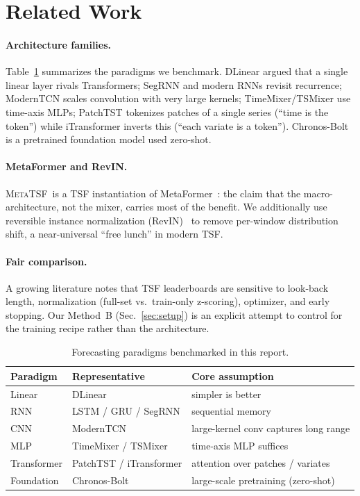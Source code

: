 \documentclass[11pt]{article}
\newcommand{\mtsf}{\textsc{MetaTSF}}
\begin{document}
\section{Related Work}

\paragraph{Architecture families.} Table~\ref{tab:paradigms} summarizes the
paradigms we benchmark. DLinear argued that a single linear layer rivals
Transformers; SegRNN and modern RNNs revisit recurrence; ModernTCN scales
convolution with very large kernels; TimeMixer/TSMixer use time-axis MLPs;
PatchTST tokenizes patches of a single series (``time is the token'') while
iTransformer inverts this (``each variate is a token''). Chronos-Bolt is a
pretrained foundation model used zero-shot.

\paragraph{MetaFormer and RevIN.} \mtsf\ is a TSF instantiation of
MetaFormer~\cite{metaformer}: the claim that the macro-architecture, not the
mixer, carries most of the benefit. We additionally use reversible instance
normalization (RevIN)~\cite{revin} to remove per-window distribution shift, a
near-universal ``free lunch'' in modern TSF.

\paragraph{Fair comparison.} A growing literature notes that TSF leaderboards are
sensitive to look-back length, normalization (full-set vs.\ train-only z-scoring),
optimizer, and early stopping. Our Method~B (Sec.~\ref{sec:setup}) is an explicit
attempt to control for the training recipe rather than the architecture.

\begin{table}[t]
\centering
\caption{Forecasting paradigms benchmarked in this report.}
\label{tab:paradigms}
\small
\begin{tabular}{@{}lll@{}}
\toprule
Paradigm & Representative & Core assumption \\
\midrule
Linear      & DLinear                 & simpler is better \\
RNN         & LSTM / GRU / SegRNN      & sequential memory \\
CNN         & ModernTCN                & large-kernel conv captures long range \\
MLP         & TimeMixer / TSMixer      & time-axis MLP suffices \\
Transformer & PatchTST / iTransformer  & attention over patches / variates \\
Foundation  & Chronos-Bolt             & large-scale pretraining (zero-shot) \\
\bottomrule
\end{tabular}
\end{table}
\end{document}
